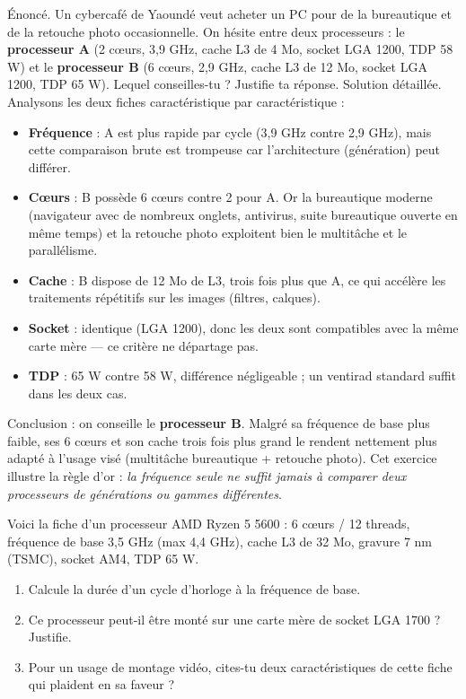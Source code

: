 \documentclass[11pt]{article}
\begin{document}
\begin{exoresolu}
Énoncé. Un cybercafé de Yaoundé veut acheter un PC pour de la bureautique et de la retouche photo occasionnelle. On hésite entre deux processeurs : le \textbf{processeur A} (2 cœurs, 3,9 GHz, cache L3 de 4 Mo, socket LGA 1200, TDP 58 W) et le \textbf{processeur B} (6 cœurs, 2,9 GHz, cache L3 de 12 Mo, socket LGA 1200, TDP 65 W). Lequel conseilles-tu ? Justifie ta réponse.
\tcblower
Solution détaillée. Analysons les deux fiches caractéristique par caractéristique :
\begin{itemize}
\item \textbf{Fréquence} : A est plus rapide par cycle (3,9 GHz contre 2,9 GHz), mais cette comparaison brute est trompeuse car l'architecture (génération) peut différer.
\item \textbf{Cœurs} : B possède 6 cœurs contre 2 pour A. Or la bureautique moderne (navigateur avec de nombreux onglets, antivirus, suite bureautique ouverte en même temps) et la retouche photo exploitent bien le multitâche et le parallélisme.
\item \textbf{Cache} : B dispose de 12 Mo de L3, trois fois plus que A, ce qui accélère les traitements répétitifs sur les images (filtres, calques).
\item \textbf{Socket} : identique (LGA 1200), donc les deux sont compatibles avec la même carte mère — ce critère ne départage pas.
\item \textbf{TDP} : 65 W contre 58 W, différence négligeable ; un ventirad standard suffit dans les deux cas.
\end{itemize}
Conclusion : on conseille le \textbf{processeur B}. Malgré sa fréquence de base plus faible, ses 6 cœurs et son cache trois fois plus grand le rendent nettement plus adapté à l'usage visé (multitâche bureautique + retouche photo). Cet exercice illustre la règle d'or : \emph{la fréquence seule ne suffit jamais à comparer deux processeurs de générations ou gammes différentes}.
\end{exoresolu}

\begin{exercice}
Voici la fiche d'un processeur AMD Ryzen 5 5600 : 6 cœurs / 12 threads, fréquence de base 3,5 GHz (max 4,4 GHz), cache L3 de 32 Mo, gravure 7 nm (TSMC), socket AM4, TDP 65 W.
\begin{enumerate}
\item Calcule la durée d'un cycle d'horloge à la fréquence de base.
\item Ce processeur peut-il être monté sur une carte mère de socket LGA 1700 ? Justifie.
\item Pour un usage de montage vidéo, cites-tu deux caractéristiques de cette fiche qui plaident en sa faveur ?
\end{enumerate}
\end{exercice}
\end{document}
